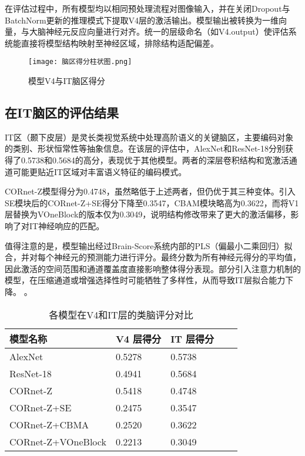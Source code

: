 在评估过程中，所有模型均以相同预处理流程对图像输入，并在关闭Dropout与BatchNorm更新的推理模式下提取V4层的激活输出。模型输出被转换为一维向量，与大脑神经元反应向量进行对齐。统一的层级命名（如V4.output）使评估系统能直接将模型结构映射至神经区域，排除结构适配偏差。

\begin{figure}[hbt]
	\centering
	\texttt{[image: 脑区得分柱状图.png]}
	\caption{模型V4与IT脑区得分}
	\label{f.脑区得分柱状图}
\end{figure}

\subsection{在IT脑区的评估结果}

IT区（颞下皮层）是灵长类视觉系统中处理高阶语义的关键脑区，主要编码对象的类别、形状恒常性等抽象信息。在该层的评估中，AlexNet和ResNet-18分别获得了0.5738和0.5684的高分，表现优于其他模型。两者的深层卷积结构和宽激活通道可能更贴近IT区域对丰富语义特征的编码模式。

CORnet-Z模型得分为0.4748，虽然略低于上述两者，但仍优于其三种变体。引入SE模块后的CORnet-Z+SE得分下降至0.3547，CBAM模块略高为0.3622，而将V1层替换为VOneBlock的版本仅为0.3049，说明结构修改带来了更大的激活偏移，影响了对IT神经响应的匹配。

值得注意的是，模型输出经过Brain-Score系统内部的PLS（偏最小二乘回归）拟合，并对每个神经元的预测能力进行评分。最终分数为所有神经元得分的平均值，因此激活的空间范围和通道覆盖度直接影响整体得分表现。部分引入注意力机制的模型，在压缩通道或增强选择性时可能牺牲了多样性，从而导致IT层拟合能力下降。
。

\begin{table}[htb]
	\centering
	\caption{各模型在V4和IT层的类脑评分对比}
	\label{tab:各模型在V4和IT层的类脑评分对比}
	\begin{tabular}{lllll}
		\hline
		模型名称& V4 层得分 & IT 层得分 \\
		\hline
		AlexNet & 0.5278 & 0.5738  \\
		ResNet-18 & 0.4941 & 0.5684  \\
		CORnet-Z & 0.5418 & 0.4748  \\
		CORnet-Z+SE  & 0.2475 & 0.3547  \\
		CORnet-Z+CBMA & 0.2520 & 0.3622  \\
		CORnet-Z+VOneBlock & 0.2213 & 0.3049  \\
		\hline
	\end{tabular}
\end{table}

